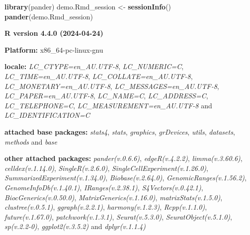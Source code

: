 \documentclass[
]{book}
\newenvironment{Shaded}{\begin{snugshade}}{\end{snugshade}}
\newcommand{\FunctionTok}[1]{\textcolor[rgb]{0.13,0.29,0.53}{\textbf{#1}}}
\newcommand{\NormalTok}[1]{#1}
\newcommand{\OtherTok}[1]{\textcolor[rgb]{0.56,0.35,0.01}{#1}}
\begin{document}
\begin{Shaded}
\begin{Highlighting}[]

\FunctionTok{library}\NormalTok{(pander)}
\NormalTok{demo.Rmd\_session }\OtherTok{\textless{}{-}} \FunctionTok{sessionInfo}\NormalTok{()}
\FunctionTok{pander}\NormalTok{(demo.Rmd\_session)}
\end{Highlighting}
\end{Shaded}

\textbf{R version 4.4.0 (2024-04-24)}

\textbf{Platform:} x86\_64-pc-linux-gnu

\textbf{locale:}
\emph{LC\_CTYPE=en\_AU.UTF-8}, \emph{LC\_NUMERIC=C}, \emph{LC\_TIME=en\_AU.UTF-8}, \emph{LC\_COLLATE=en\_AU.UTF-8}, \emph{LC\_MONETARY=en\_AU.UTF-8}, \emph{LC\_MESSAGES=en\_AU.UTF-8}, \emph{LC\_PAPER=en\_AU.UTF-8}, \emph{LC\_NAME=C}, \emph{LC\_ADDRESS=C}, \emph{LC\_TELEPHONE=C}, \emph{LC\_MEASUREMENT=en\_AU.UTF-8} and \emph{LC\_IDENTIFICATION=C}

\textbf{attached base packages:}
\emph{stats4}, \emph{stats}, \emph{graphics}, \emph{grDevices}, \emph{utils}, \emph{datasets}, \emph{methods} and \emph{base}

\textbf{other attached packages:}
\emph{pander(v.0.6.6)}, \emph{edgeR(v.4.2.2)}, \emph{limma(v.3.60.6)}, \emph{celldex(v.1.14.0)}, \emph{SingleR(v.2.6.0)}, \emph{SingleCellExperiment(v.1.26.0)}, \emph{SummarizedExperiment(v.1.34.0)}, \emph{Biobase(v.2.64.0)}, \emph{GenomicRanges(v.1.56.2)}, \emph{GenomeInfoDb(v.1.40.1)}, \emph{IRanges(v.2.38.1)}, \emph{S4Vectors(v.0.42.1)}, \emph{BiocGenerics(v.0.50.0)}, \emph{MatrixGenerics(v.1.16.0)}, \emph{matrixStats(v.1.5.0)}, \emph{clustree(v.0.5.1)}, \emph{ggraph(v.2.2.1)}, \emph{harmony(v.1.2.3)}, \emph{Rcpp(v.1.1.0)}, \emph{future(v.1.67.0)}, \emph{patchwork(v.1.3.1)}, \emph{Seurat(v.5.3.0)}, \emph{SeuratObject(v.5.1.0)}, \emph{sp(v.2.2-0)}, \emph{ggplot2(v.3.5.2)} and \emph{dplyr(v.1.1.4)}
\end{document}
